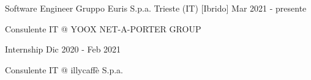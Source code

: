

\begin{cventries}

  \cventry
    {Software Engineer} %
    {Gruppo Euris S.p.a.} %
    {Trieste (IT) [Ibrido]} %
    {Mar 2021 - presente } %
    {
      \begin{cvitems} %
        \item {Consulente IT @ YOOX NET-A-PORTER GROUP}
      \end{cvitems}
    }
    
  \cventry
    {Internship} %
    {} %
    {} %
    {Dic 2020 - Feb 2021 } %
    {
      \begin{cvitems} %
        \item {Consulente IT @ illycaffè S.p.a.}
      \end{cvitems}
    }

\end{cventries}
